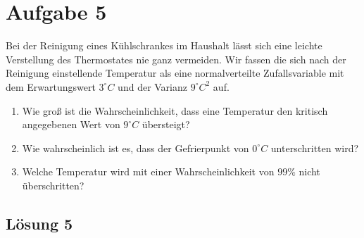 \documentclass[main.tex]{subfiles}
\begin{document}
\section{Aufgabe 5}
Bei der Reinigung eines Kühlschrankes im Haushalt lässt sich eine leichte Verstellung des Thermostates nie ganz vermeiden. Wir fassen die sich nach der Reinigung einstellende Temperatur als eine normalverteilte Zufallsvariable mit dem Erwartungswert $3^{\circ}C$ und der Varianz $9^{\circ}C^2$ auf.
\begin{enumerate}
\item Wie groß ist die Wahrscheinlichkeit, dass eine Temperatur den kritisch angegebenen Wert von $9^{\circ}C$ übersteigt?
\item Wie wahrscheinlich ist es, dass der Gefrierpunkt von $0^{\circ}C$ unterschritten wird?
\item Welche Temperatur wird mit einer Wahrscheinlichkeit von $99\%$ nicht überschritten?
\end{enumerate}

\subsection{Lösung 5}
\end{document}

